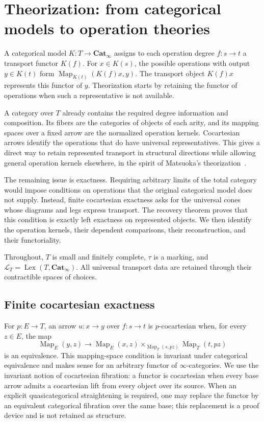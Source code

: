 \documentclass[oneside]{article}
\theoremstyle{plain}
\theoremstyle{definition}
\theoremstyle{remark}
\newcommand{\Cat}{\mathbf{Cat}_{\infty}}
\newcommand{\Lex}{\operatorname{Lex}}
\newcommand{\Map}{\operatorname{Map}}
\begin{document}
\section{Theorization: from categorical models to operation theories}\label{sec:theorization}
A categorical model $K:T\to\Cat$ assigns to each operation degree
$f:s\to t$ a transport functor $K(f)$. For $x\in K(s)$, the possible
operations with output $y\in K(t)$ form
$\Map_{K(t)}(K(f)x,y)$. The transport object $K(f)x$ represents this
functor of $y$. Theorization starts by retaining the functor of operations
when such a representative is not available.

A category over $T$ already contains the required degree information and
composition. Its fibers are the categories of objects of each arity, and
its mapping spaces over a fixed arrow are the normalized operation
kernels. Cocartesian arrows identify the operations that do have universal
representatives. This gives a direct way to retain represented transport
in structural directions while allowing general operation kernels
elsewhere, in the spirit of Matsuoka's theorization~\cite{Matsuoka2017}.

The remaining issue is exactness. Requiring arbitrary limits of the total
category would impose conditions on operations that the original
categorical model does not supply. Instead, finite cocartesian exactness
asks for the universal cones whose diagrams and legs express transport.
The recovery theorem proves that this condition is exactly left
exactness on represented objects. We then identify the operation kernels,
their dependent comparisons, their reconstruction, and their functoriality.

Throughout, $T$ is small and finitely complete, $\tau$ is a marking, and
$\mathcal L_T=\Lex(T,\Cat)$. All universal transport data are retained
through their contractible spaces of choices.

\subsection{Finite cocartesian exactness}\label{sec:thz:recovery}

For $p:E\to T$, an arrow $u:x\to y$ over $f:s\to t$ is
$p$-cocartesian when, for every $z\in E$, the map
\begin{equation}\label{thz:eq:cocart}
 \Map_E(y,z)\longrightarrow
 \Map_E(x,z)\times_{\Map_T(s,pz)}\Map_T(t,pz)
\end{equation}
is an equivalence.  This mapping-space condition is invariant under
categorical equivalence and makes sense for an arbitrary functor of
$\infty$-categories.  We use the invariant notion of cocartesian fibration:
a functor is cocartesian when every base arrow admits a cocartesian lift from
every object over its source.  When an explicit quasicategorical
straightening is required, one may replace the functor by an equivalent
categorical fibration over the same base; this replacement is a proof device
and is not retained as structure.\cite{HHLN2023}
\end{document}
